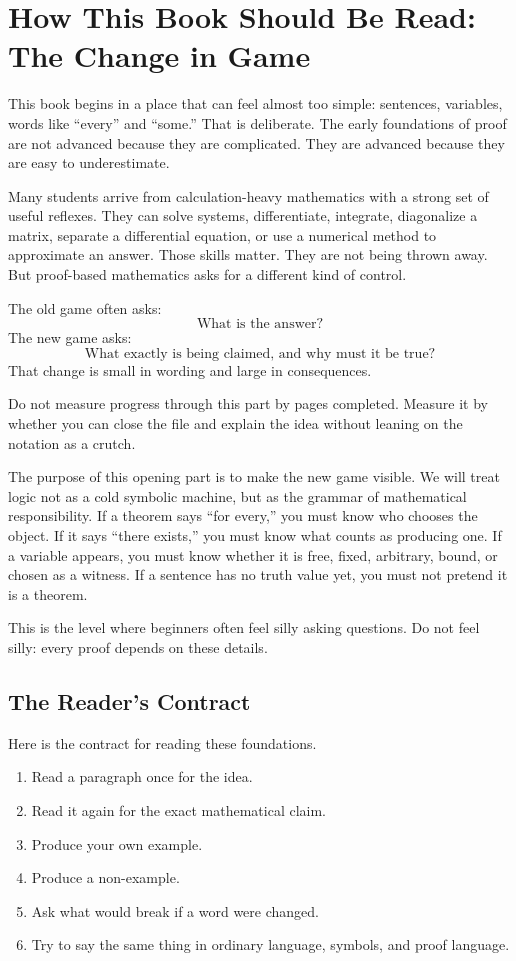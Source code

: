 \section{How This Book Should Be Read: The Change in Game}

This book begins in a place that can feel almost too simple: sentences, variables, words like ``every'' and ``some.'' That is deliberate. The early foundations of proof are not advanced because they are complicated. They are advanced because they are easy to underestimate.

Many students arrive from calculation-heavy mathematics with a strong set of useful reflexes. They can solve systems, differentiate, integrate, diagonalize a matrix, separate a differential equation, or use a numerical method to approximate an answer. Those skills matter. They are not being thrown away. But proof-based mathematics asks for a different kind of control.

The old game often asks:
\[
\text{What is the answer?}
\]
The new game asks:
\[
\text{What exactly is being claimed, and why must it be true?}
\]
That change is small in wording and large in consequences.

\begin{focusbox}
Do not measure progress through this part by pages completed. Measure it by whether you can close the file and explain the idea without leaning on the notation as a crutch.
\end{focusbox}

The purpose of this opening part is to make the new game visible. We will treat logic not as a cold symbolic machine, but as the grammar of mathematical responsibility. If a theorem says ``for every,'' you must know who chooses the object. If it says ``there exists,'' you must know what counts as producing one. If a variable appears, you must know whether it is free, fixed, arbitrary, bound, or chosen as a witness. If a sentence has no truth value yet, you must not pretend it is a theorem.

This is the level where beginners often feel silly asking questions. Do not feel silly: every proof depends on these details.

\subsection{The Reader's Contract}

Here is the contract for reading these foundations.

\begin{enumerate}
\item Read a paragraph once for the idea.
\item Read it again for the exact mathematical claim.
\item Produce your own example.
\item Produce a non-example.
\item Ask what would break if a word were changed.
\item Try to say the same thing in ordinary language, symbols, and proof language.
\end{enumerate}

